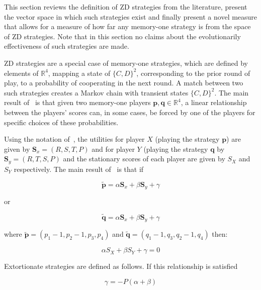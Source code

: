\documentclass[10pt,letterpaper]{article}
\begin{document}
This section reviews the definition of ZD
strategies from the literature, present the vector space in which such
strategies exist and finally present a novel measure that allows for a measure
of how far any memory-one strategy is from the space of ZD
strategies. Note that in this section no claims about the evolutionarily
effectiveness of such strategies are made.

ZD strategies are a special case of memory-one strategies,
which are defined by elements of \(\mathbb{R}^4\), mapping a state of
\({\{C, D\}}^2\), corresponding to the prior round of play, to a probability of
cooperating in the next round. A match between two such strategies creates a
Markov chain with transient states \({\{C, D\}}^2\). The main result
of~\cite{Press2012} is that given two memory-one players \(\textbf{p},
\textbf{q}\in\mathbb{R}^4\), a linear relationship between the players' scores can, in
some cases, be forced by one of the players for specific choices of these
probabilities.

Using the notation of~\cite{Press2012}, the utilities for player \(X\) (playing
the strategy \(\textbf{p}\))
are given by \(\textbf{S}_x=(R, S, T, P)\) and for player \(Y\) (playing the
strategy \(\textbf{q}\) by \(\textbf{S}_y=(R, T, S, P)\)
and the stationary scores of each player are given by \(S_X\) and \(S_Y\)
respectively. The main result of~\cite{Press2012} is that if

\begin{equation}\label{eqn:linear_relationship_for_p}
    \tilde{\textbf{p}}=\alpha \textbf{S}_x + \beta \textbf{S}_y + \gamma
\end{equation}

or

\begin{equation}\label{eqn:linear_relationship_for_q}
    \tilde{\textbf{q}}=\alpha \textbf{S}_x + \beta \textbf{S}_y + \gamma
\end{equation}

where \(\tilde{\textbf{p}} = (p_1 - 1, p_2 - 1, p_3, p_4)\) and
\(\tilde{\textbf{q}} = (q_1 - 1, q_3, q_2 - 1, q_4)\) then:

\begin{equation}
    \alpha S_X + \beta S_Y + \gamma = 0
\end{equation}

Extortionate strategies are defined as follows. If this relationship is
satisfied

\begin{equation}\label{eqn:constraint_for_extortion}
    \gamma = - P(\alpha + \beta)
\end{equation}
\end{document}

